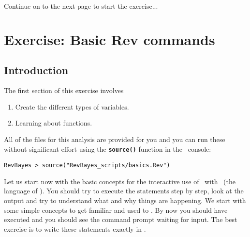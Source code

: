 \documentclass[11pt]{article}
\newcommand{\cl}[1]{{\texttt{\textbf{#1}}}}
\newcommand{\mbcl}[1]{\exs{\cl{MrBayes > {#1}}}}
\begin{document}
%



\vspace{5mm}

{\begin{framed}
\begin{center}
Continue on to the next page to start the exercise...
\end{center}
\end{framed}}






%
%
\newpage
\FloatBarrier
\section{Exercise: Basic Rev commands}

\subsection{Introduction}

The first section of this exercise involves 
\begin{enumerate}
\item Create the different types of variables.
\item Learning about functions. 
\end{enumerate}

All of the files for this analysis are provided for you and you can run these without significant effort using the \cl{source()} function in the \RevBayes~console:
{\tt \begin{snugshade*}
\begin{lstlisting}
RevBayes > source("RevBayes_scripts/basics.Rev")
\end{lstlisting}
\end{snugshade*}}


Let us start now with the basic concepts for the interactive use of \RevBayes~with \Rev~(the language of \RevBayes). 
You should try to execute the statements step by step, look at the output and try to understand what and why things are happening. 
We start with some simple concepts to get familiar and used to \RevBayes. 
By now you should have executed \RevBayes and you should see the command prompt waiting for input. 
The best exercise is to write these statements exactly in \RevBayes. 
\end{document}
